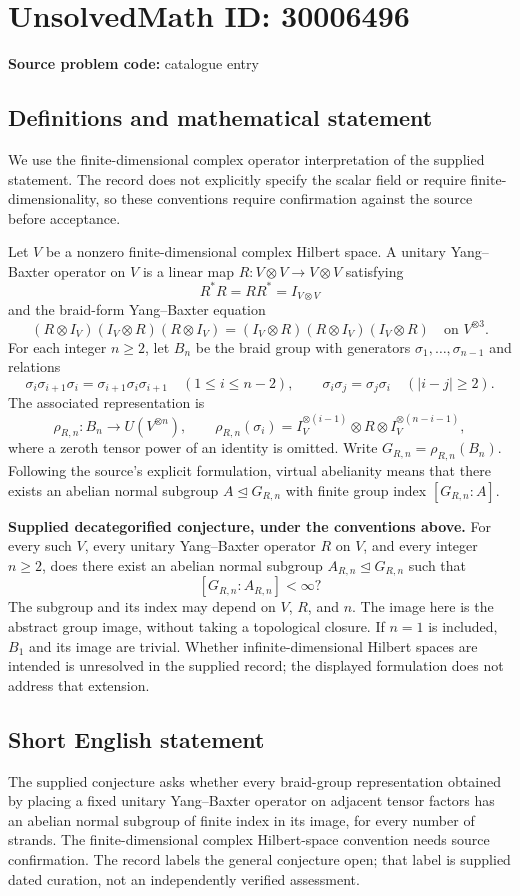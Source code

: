 \documentclass[11pt]{article}
\begin{document}
\section*{UnsolvedMath ID: 30006496}
\textbf{Source problem code:} catalogue entry
\subsection{Definitions and mathematical statement}
We use the finite-dimensional complex operator interpretation of the supplied statement. The record does not explicitly specify the scalar field or require finite-dimensionality, so these conventions require confirmation against the source before acceptance.

Let \(V\) be a nonzero finite-dimensional complex Hilbert space. A unitary Yang--Baxter operator on \(V\) is a linear map \(R:V\otimes V\to V\otimes V\) satisfying
\[
R^*R=RR^*=I_{V\otimes V}
\]
and the braid-form Yang--Baxter equation
\[
(R\otimes I_V)(I_V\otimes R)(R\otimes I_V)
=(I_V\otimes R)(R\otimes I_V)(I_V\otimes R)
\quad\text{on }V^{\otimes 3}.
\]
For each integer \(n\geq 2\), let \(B_n\) be the braid group with generators \(\sigma_1,\ldots,\sigma_{n-1}\) and relations
\[
\sigma_i\sigma_{i+1}\sigma_i=\sigma_{i+1}\sigma_i\sigma_{i+1}
\quad(1\leq i\leq n-2),
\qquad
\sigma_i\sigma_j=\sigma_j\sigma_i
\quad(|i-j|\geq 2).
\]
The associated representation is
\[
\rho_{R,n}:B_n\longrightarrow U(V^{\otimes n}),
\qquad
\rho_{R,n}(\sigma_i)
=I_V^{\otimes(i-1)}\otimes R\otimes I_V^{\otimes(n-i-1)},
\]
where a zeroth tensor power of an identity is omitted. Write \(G_{R,n}=\rho_{R,n}(B_n)\). Following the source's explicit formulation, virtual abelianity means that there exists an abelian normal subgroup \(A\trianglelefteq G_{R,n}\) with finite group index \([G_{R,n}:A]\).

\textbf{Supplied decategorified conjecture, under the conventions above.} For every such \(V\), every unitary Yang--Baxter operator \(R\) on \(V\), and every integer \(n\geq 2\), does there exist an abelian normal subgroup \(A_{R,n}\trianglelefteq G_{R,n}\) such that
\[
[G_{R,n}:A_{R,n}]<\infty?
\]
The subgroup and its index may depend on \(V\), \(R\), and \(n\). The image here is the abstract group image, without taking a topological closure. If \(n=1\) is included, \(B_1\) and its image are trivial. Whether infinite-dimensional Hilbert spaces are intended is unresolved in the supplied record; the displayed formulation does not address that extension.
\subsection{Short English statement}
The supplied conjecture asks whether every braid-group representation obtained by placing a fixed unitary Yang--Baxter operator on adjacent tensor factors has an abelian normal subgroup of finite index in its image, for every number of strands. The finite-dimensional complex Hilbert-space convention needs source confirmation. The record labels the general conjecture open; that label is supplied dated curation, not an independently verified assessment.
\end{document}
